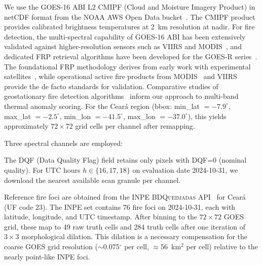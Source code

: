 \documentclass[11pt,twocolumn,a4paper]{article}
\newcommand{\abbrev}[1]{{\small\textsc{#1}}}
\begin{document}
We use the \abbrev{GOES-16} \abbrev{ABI} L2 \abbrev{CMIPF} (Cloud and Moisture Imagery Product) in netCDF format from the \abbrev{NOAA} AWS Open Data bucket~\cite{noaa2025}. The \abbrev{CMIPF} product provides calibrated brightness temperatures at 2~km resolution at nadir. For fire detection, the multi-spectral capability of \abbrev{GOES-16} \abbrev{ABI} has been extensively validated against higher-resolution sensors such as \abbrev{VIIRS} and \abbrev{MODIS}~\cite{zhang2022_goes16}, and dedicated \abbrev{FRP} retrieval algorithms have been developed for the GOES-R series~\cite{xu2020_goesfrp}. The foundational \abbrev{FRP} methodology derives from early work with experimental satellites~\cite{wooster2003_frp}, while operational active fire products from \abbrev{MODIS}~\cite{giglio2016_modis} and \abbrev{VIIRS}~\cite{schroeder2014_viiirs} provide the de facto standards for validation. Comparative studies of geostationary fire detection algorithms~\cite{hally2017_fire} inform our approach to multi-band thermal anomaly scoring. For the Cear\'{a} region (bbox: min\_lat $= -7.9^\circ$, max\_lat $= -2.5^\circ$, min\_lon $= -41.5^\circ$, max\_lon $= -37.0^\circ$), this yields approximately $72\times 72$ grid cells per channel after remapping.

Three spectral channels are employed:

\begin{table}[htbp]
\centering
\caption{\abbrev{GOES-16} \abbrev{ABI} spectral channels used.}
\label{tab:channels}
\small
{}
\end{table}

The \abbrev{DQF} (Data Quality Flag) field retains only pixels with \abbrev{DQF}=0 (nominal quality). For UTC hours $h \in \{16, 17, 18\}$ on evaluation date 2024-10-31, we download the nearest available scan granule per channel.

Reference fire foci are obtained from the \abbrev{INPE} \abbrev{BDQueimadas} \abbrev{API}~\cite{inpe_bdqueimadas2025} for Cear\'{a} (UF code 23). The \abbrev{INPE} set contains 76 fire foci on 2024-10-31, each with latitude, longitude, and UTC timestamp. After binning to the $72\times 72$ \abbrev{GOES} grid, these map to 49 raw truth cells and 284 truth cells after one iteration of $3\times 3$ morphological dilation. This dilation is a necessary compensation for the coarse \abbrev{GOES} grid resolution ($\sim$0.075$^\circ$ per cell, $\approx$56~km$^2$ per cell) relative to the nearly point-like \abbrev{INPE} foci.
\end{document}
